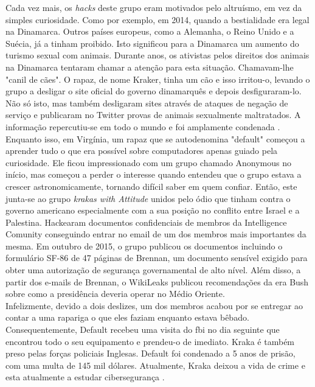 \documentclass{report}
\begin{document}
Cada vez mais, os \textit{hacks} deste grupo eram motivados pelo altruísmo, em vez da simples curiosidade. Como por exemplo, em 2014, quando a bestialidade era legal na Dinamarca. Outros países europeus, como a Alemanha, o Reino Unido e a Suécia, já a tinham proibido. Isto significou para a Dinamarca um aumento do turismo sexual com animais. Durante anos, os ativistas pelos direitos dos animais na Dinamarca tentaram chamar a atenção para esta situação. Chamavam-lhe "canil de cães". O rapaz, de nome Kraker, tinha um cão e isso irritou-o, levando o grupo a desligar o site oficial do governo dinamarquês e depois desfiguraram-lo. Não só isto, mas também desligaram sites através de ataques de negação de serviço e publicaram no Twitter provas de animais sexualmente maltratados. A informação repercutiu-se em todo o mundo e foi amplamente condenada \cite{adolescentecia}. \\ \indent Enquanto isso, em Virgínia, um rapaz que se autodenomina "default" começou a aprender tudo o que era possível sobre computadores apenas guiado pela curiosidade. Ele ficou impressionado com um grupo chamado Anonymous no início, mas começou a perder o interesse quando entendeu que o grupo estava a crescer astronomicamente, tornando difícil saber em quem confiar. Então, este junta-se ao grupo \textit{krakas with Attitude} unidos pelo ódio que tinham contra o governo americano especialmente com a sua posição no conflito entre Israel e a Palestina. Hackearam documentos confidenciais de membros da Intelligence Comunity conseguindo entrar no email de um dos membros mais importantes da mesma. Em outubro de 2015, o grupo publicou os documentos incluindo o formulário SF-86 de 47 páginas de Brennan, um documento sensível exigido para obter uma autorização de segurança governamental de alto nível. Além disso, a partir dos e-mails de Brennan, o WikiLeaks publicou recomendações da era Bush sobre como a presidência deveria operar no Médio Oriente. \\ \indent Infelizmente, devido a dois deslizes, um dos membros acabou por se entregar ao contar a uma rapariga o que eles faziam enquanto estava bêbado. Consequentemente, Default recebeu uma visita do \ac{fbi} no dia seguinte que encontrou todo o seu equipamento e prendeu-o de imediato. Kraka é também preso pelas forças policiais Inglesas. Default foi condenado a 5 anos de prisão, com uma multa de 145 mil dólares. Atualmente, Kraka deixou a vida de crime e esta atualmente a estudar cibersegurança \cite{presocia}.
\end{document}
